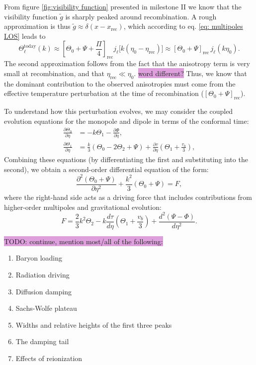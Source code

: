 \documentclass{aa}
\numberwithin{equation}{section}
\numberwithin{table}{section}
\numberwithin{figure}{section}
\begin{document}
From figure \ref{fig:visibility function} presented in milestone II we know that the visibility function $\tilde{g}$ is sharply peaked around recombination. A rough approximation is thus $\tilde{g}\approx\delta(x-x_\text{rec})$, which according to eq. \eqref{eq: multipoles LOS} leads to
\begin{equation}
  \Theta^\text{today}_\ell(k) \approx \left[ \Theta_0+\Psi+\frac{\Pi}{4}\right]_\text{rec}j_\ell\big[k(\eta_0 - \eta_\text{rec})\big] \approx \left[ \Theta_0+\Psi\right]_\text{rec}\,j_\ell(k\eta_0).
\end{equation}
The second approximation follows from the fact that the anisotropy term is very small at recombination, and that $\eta_\text{rec}\ll\eta_0$. \colorbox{Plum}{word different?} Thus, we know that the dominant contribution to the observed anisotropies must come from the effective temperature perturbation at the time of recombination ($\left[ \Theta_0+\Psi\right]_\text{rec}$). 

To understand how this perturbation evolves, we may consider the coupled evolution equations for the monopole and dipole in terms of the conformal time:
\begin{align}
\frac{\partial \Theta_0}{\partial \eta} &= -k \Theta_1 - \frac{\partial \Phi}{\partial \eta}, \\
\frac{\partial \Theta_1}{\partial \eta} &= \frac{k}{3}(\Theta_0 - 2\Theta_2 + \Psi) + \frac{\partial \tau}{\partial \eta} \left( \Theta_1 + \frac{v_b}{3} \right),
\end{align}
Combining these equations (by differentiating the first and substituting into the second), we obtain a second-order differential equation of the form:
\begin{equation}
\frac{\partial^2 (\Theta_0 + \Psi)}{\partial \eta^2} + \frac{k^2}{3} (\Theta_0 + \Psi) = F, \label{eq: forced}
\end{equation}
where the right-hand side acts as a driving force that includes contributions from higher-order multipoles and gravitational evolution:
\begin{equation}
F = \frac{2}{3}k^2 \Theta_2 - k \frac{d\tau}{d\eta} \left( \Theta_1 + \frac{v_b}{3} \right) + \frac{d^2 (\Psi - \Phi)}{d\eta^2}.
\end{equation}

\colorbox{Plum}{TODO: continue, mention most/all of the following:}
\begin{enumerate}
  \item Baryon loading
  \item Radiation driving
  \item Diffusion damping
  \item Sachs-Wolfe plateau 
  \item Widths and relative heights of the first three peaks
  \item The damping tail
  \item Effects of reionization
\end{enumerate}
\end{document}
